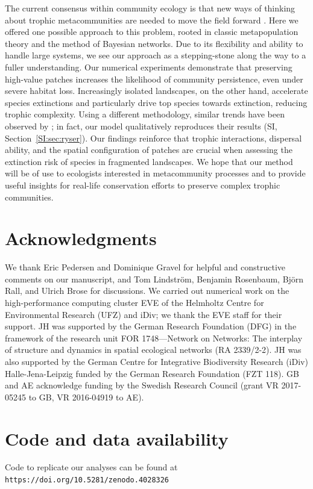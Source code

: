 \documentclass[11pt]{article}
\newcommand{\SI}{SI}
\begin{document}
The current consensus within community ecology is that new ways of thinking about trophic metacommunities are needed to move the field forward \citep{LeiboldChase2018, Guzman2018, Hirtetal2018}. Here we offered one possible approach to this problem, rooted in classic metapopulation theory and the method of Bayesian networks. Due to its flexibility and ability to handle large systems, we see our approach as a stepping-stone along the way to a fuller understanding. Our numerical experiments demonstrate that preserving high-value patches increases the likelihood of community persistence, even under severe habitat loss. Increasingly isolated landscapes, on the other hand, accelerate species extinctions and particularly drive top species towards extinction, reducing trophic complexity.  Using a different methodology, similar trends have been observed by \citet{Ryser2019}; in fact, our model qualitatively reproduces their results (\SI, Section~\ref{SI:sec:ryser}). Our findings reinforce that trophic interactions, dispersal ability, and the spatial configuration of patches are crucial when assessing the extinction risk of species in fragmented landscapes. We hope that our method will be of use to ecologists interested in metacommunity processes and to provide useful insights for real-life conservation efforts to preserve complex trophic communities.


\section*{Acknowledgments} \label{sec:thanks}

We thank Eric Pedersen and Dominique Gravel for helpful and constructive comments on our manuscript, and Tom Lindstr\"om, Benjamin Rosenbaum, Bj\"orn Rall, and Ulrich Brose for discussions. We carried out numerical work on the high-performance computing cluster EVE of the Helmholtz Centre for Environmental Research (UFZ) and iDiv; we thank the EVE staff for their support. JH was supported by the German Research Foundation (DFG) in the framework of the research unit FOR 1748---Network on Networks: The interplay of structure and dynamics in spatial ecological networks (RA 2339/2-2). JH was also supported by the German Centre for Integrative Biodiversity Research (iDiv) Halle-Jena-Leipzig funded by the German Research Foundation (FZT 118). GB and AE acknowledge funding by the Swedish Research Council (grant VR 2017-05245 to GB, VR 2016-04919 to AE).


\section*{Code and data availability} \label{sec:avail}

Code to replicate our analyses can be found at \texttt{https://doi.org/10.5281/zenodo.4028326}



{\setlength{\bibsep}{4.0pt} \footnotesize }



\end{document}
